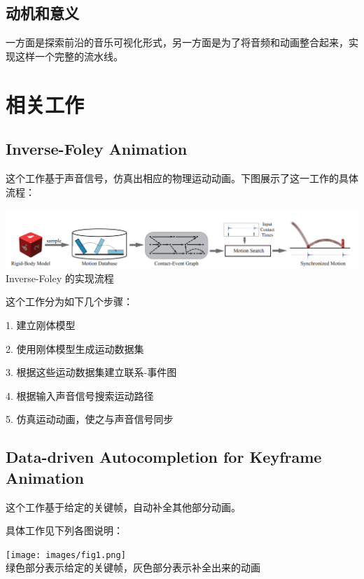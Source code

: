 \documentclass[a4paper, 12pt]{article}
\begin{document}
\subsection{动机和意义}

一方面是探索前沿的音乐可视化形式，另一方面是为了将音频和动画整合起来，实现这样一个完整的流水线。

\section{相关工作}

\subsection{Inverse-Foley Animation}

这个工作基于声音信号，仿真出相应的物理运动动画。下图展示了这一工作的具体流程：

\begin{center}
\includegraphics[width=\textwidth]{images/inverse_foley.png}\\
Inverse-Foley 的实现流程
\end{center}

这个工作分为如下几个步骤：

1. 建立刚体模型

2. 使用刚体模型生成运动数据集

3. 根据这些运动数据集建立联系-事件图

4. 根据输入声音信号搜索运动路径

5. 仿真运动动画，使之与声音信号同步


\subsection{Data-driven Autocompletion for Keyframe Animation}

这个工作基于给定的关键帧，自动补全其他部分动画。

具体工作见下列各图说明：

\begin{center}
\texttt{[image: images/fig1.png]}\\
绿色部分表示给定的关键帧，灰色部分表示补全出来的动画
\end{center}
\end{document}
